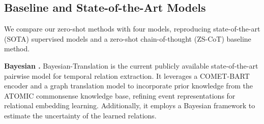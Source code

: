 


\subsection{Baseline and State-of-the-Art Models}
\label{section:experiment:baselines}

We compare our zero-shot methods with four models, reproducing state-of-the-art (SOTA) supervised models and a zero-shot chain-of-thought (ZS-CoT) baseline method.

\textbf{Bayesian \cite{tan-etal-2023-event}.} 
Bayesian-Translation is the current publicly available state-of-the-art pairwise model for temporal relation extraction. It leverages a COMET-BART encoder \cite{Hwang2020COMETATOMIC2O} and a graph translation model \cite{Balazevic2019MultirelationalPG} to incorporate prior knowledge from the ATOMIC commonsense knowledge base, refining event representations for relational embedding learning. Additionally, it employs a Bayesian framework to estimate the uncertainty of the learned relations.






